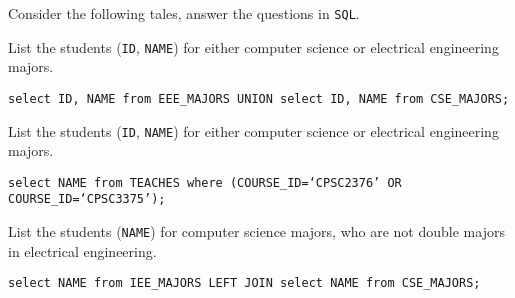 \documentclass[11pt]{article}
\begin{document}
\begin{question}
    Consider the following tales, answer the questions in {\tt SQL}.

    \begin{subquestion}
        List the students ({\tt ID}, {\tt NAME}) for either computer science or electrical engineering majors.

        {\tt select ID, NAME from EEE\_MAJORS UNION select ID, NAME from CSE\_MAJORS;}
    \end{subquestion}

    \begin{subquestion}
        List the students ({\tt ID}, {\tt NAME}) for either computer science or electrical engineering majors.

        {\tt select NAME from TEACHES where (COURSE\_ID=`CPSC2376' OR\\ COURSE\_ID=`CPSC3375');}
    \end{subquestion}

    \begin{subquestion}
        List the students ({\tt NAME}) for computer science majors, who are not double majors in electrical engineering.

        {\tt select NAME from IEE\_MAJORS LEFT JOIN select NAME from CSE\_MAJORS;}
    \end{subquestion}

\end{question}
\end{document}
